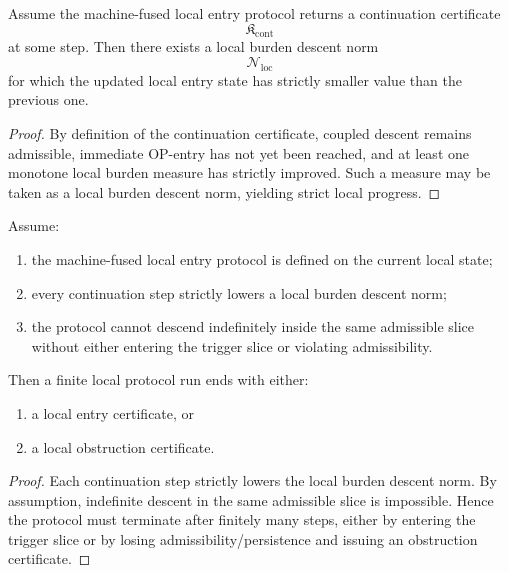 \begin{proposition}
\label{prop:continuation-implies-local-progress}
Assume the machine-fused local entry protocol returns a continuation certificate
\[
\mathfrak{K}_{\mathrm{cont}}
\]
at some step.
Then there exists a local burden descent norm
\[
\mathcal{N}_{\mathrm{loc}}
\]
for which the updated local entry state has strictly smaller value than the previous one.
\end{proposition}

\begin{proof}
By definition of the continuation certificate, coupled descent remains admissible, immediate OP-entry has not yet been reached, and at least one monotone local burden measure has strictly improved.
Such a measure may be taken as a local burden descent norm, yielding strict local progress.
\end{proof}

\begin{lemma}
\label{lem:finite-local-entry-or-obstruction-lemma}
Assume:
\begin{enumerate}
    \item the machine-fused local entry protocol is defined on the current local state;
    \item every continuation step strictly lowers a local burden descent norm;
    \item the protocol cannot descend indefinitely inside the same admissible slice without either entering the trigger slice or violating admissibility.
\end{enumerate}
Then a finite local protocol run ends with either:
\begin{enumerate}
    \item a local entry certificate, or
    \item a local obstruction certificate.
\end{enumerate}
\end{lemma}

\begin{proof}
Each continuation step strictly lowers the local burden descent norm.
By assumption, indefinite descent in the same admissible slice is impossible.
Hence the protocol must terminate after finitely many steps, either by entering the trigger slice or by losing admissibility/persistence and issuing an obstruction certificate.
\end{proof}

